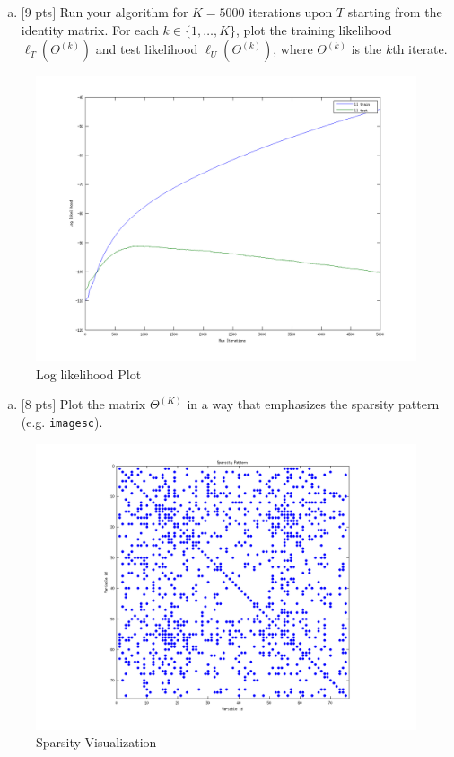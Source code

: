 \documentclass[12pt]{article}
\begin{document}
\vspace{.25cm}

\begin{enumerate}[(d)]
\item $[$9 pts$]$  Run your algorithm for $K = 5000$ iterations upon $T$ starting from the identity matrix. For each $k \in \{1,\ldots,K\}$, plot the training likelihood $\ell_T(\Theta^{(k)})$ and test likelihood $\ell_U(\Theta^{(k)})$, where $\Theta^{(k)}$ is the $k$th iterate.
\end{enumerate}

\begin{figure}[h!]
  \centering
    \includegraphics[width=\textwidth]{ll}
  \caption{Log likelihood Plot}
\end{figure}

\begin{enumerate}[(e)]
\item $[$8 pts$]$  Plot the matrix $\Theta^{(K)}$ in a way that emphasizes the sparsity pattern (e.g. \texttt{imagesc}).
\end{enumerate}


\begin{figure}[h!]
  \centering
    \includegraphics[width=\textwidth]{sp}
  \caption{Sparsity Visualization}
\end{figure}
\end{document}
